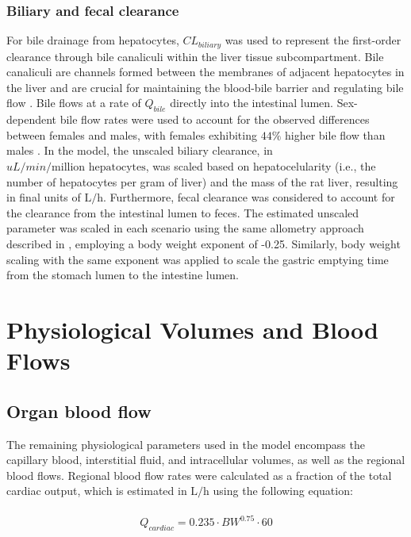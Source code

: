 \documentclass[preprint,12pt,authoryear]{elsarticle}
\begin{document}
\subsubsection{Biliary and fecal clearance}
For bile drainage from hepatocytes, $CL_{biliary}$ was used to represent the first-order clearance through bile canaliculi within the liver tissue subcompartment. Bile canaliculi are channels formed between the membranes of adjacent hepatocytes in the liver and are crucial for maintaining the blood-bile barrier and regulating bile flow \citep{gupta_2023}. Bile flows at a rate of $Q_{bile}$ directly into the intestinal lumen. Sex-dependent bile flow rates were used to account for the observed differences between females and males, with females exhibiting $44\%$ higher bile flow than males \citep{vonk_1978}. In the model, the unscaled biliary clearance, in $uL/min/\text{million hepatocytes}$, was scaled based on hepatocelularity (i.e., the number of hepatocytes per gram of liver) \citep{fattah_2016} and the mass of the rat liver, resulting in final units of $\text{L}/\text{h}$. Furthermore, fecal clearance was considered to account for the clearance from the intestinal lumen to feces. The estimated unscaled parameter was scaled in each scenario using the same allometry approach described in \citet{loccisano_2012}, employing a body weight exponent of -0.25. Similarly, body weight scaling with the same exponent was applied to scale the gastric emptying time from the stomach lumen to the intestine lumen.

 \section{Physiological Volumes and Blood Flows}

  \subsection{Organ blood flow}

The remaining physiological parameters used in the model encompass the capillary blood, interstitial fluid, and intracellular volumes, as well as the regional blood flows. Regional blood flow rates were calculated as a fraction of the total cardiac output, which is estimated in $\text{L}/\text{h}$ using the following equation:

\begin{align}
\begin{aligned}
 Q_{cardiac} = 0.235 \cdot  BW^{0.75}  \cdot 60 
\end{aligned} 
\end{align}
\end{document}
